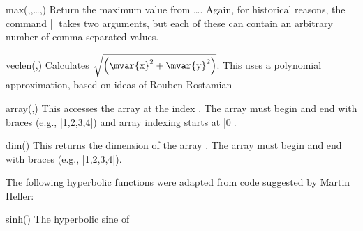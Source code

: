 \begin{math-function}{max(,,\ldots,)}
    Return the maximum value from \ldots{}. Again, for
    historical reasons, the command |\pgfmathmax| takes two arguments, but each
    of these can contain an arbitrary number of comma separated values.
\begin{codeexample}[]
 \pgfmathresult
\end{codeexample}
\end{math-function}

\begin{math-function}{veclen(,)}
\mathcommand
    Calculates $\sqrt{\left(\textrm{\mvar{x}}^2+\textrm{\mvar{y}}^2\right)}$.
    This uses a polynomial approximation, based on ideas of Rouben Rostamian
\begin{codeexample}[]
 \pgfmathresult
\end{codeexample}
\end{math-function}

\begin{math-function}{array(,)}
\mathcommand
    This accesses the array  at the index . The array must
    begin and end with braces (e.g., |{1,2,3,4}|) and array indexing starts at
    |0|.
\begin{codeexample}[]
 \pgfmathresult
\end{codeexample}
\end{math-function}

\begin{math-function}{dim()}
\mathcommand
    This returns the dimension of the array . The array must begin and
    end with braces (e.g., |{1,2,3,4}|).
\begin{codeexample}[]
 \pgfmathresult
\end{codeexample}
\end{math-function}

The following hyperbolic functions were adapted from code suggested by Martin
Heller:

\begin{math-function}{sinh()}
\mathcommand
    The hyperbolic sine of 
\begin{codeexample}[]
 \pgfmathresult
\end{codeexample}
\end{math-function}

